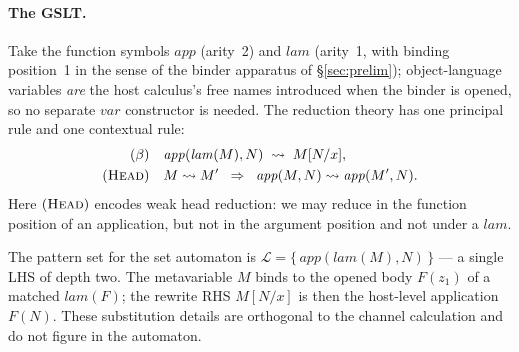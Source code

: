 \documentclass[11pt]{article}
\theoremstyle{plain}
\theoremstyle{definition}
\theoremstyle{remark}
\newcommand{\rew}{\leadsto}
\newcommand{\Lhs}{\mathcal{L}}
\begin{document}
\paragraph{The GSLT.}
Take the function symbols $\mathit{app}$ (arity~2) and $\mathit{lam}$
(arity~1, with binding position~1 in the sense of the binder apparatus
of \S\ref{sec:prelim}); object-language variables \emph{are} the host
calculus's free names introduced when the binder is opened, so no
separate $\mathit{var}$ constructor is needed. The reduction theory
has one principal rule and one contextual rule:
\begin{align*}
  (\beta) \quad
    & \mathit{app}(\mathit{lam}(M), N) \;\rew\; M[N/x], \\
  (\textsc{Head}) \quad
    & M \rew M' \;\;\Rightarrow\;\;
      \mathit{app}(M, N) \rew \mathit{app}(M', N).
\end{align*}
Here $(\textsc{Head})$ encodes weak head reduction: we may reduce in
the function position of an application, but not in the argument
position and not under a $\mathit{lam}$.

The pattern set for the set automaton is
$\Lhs = \{\,\mathit{app}(\mathit{lam}(M), N)\,\}$ --- a single LHS of
depth two. The metavariable $M$ binds to the opened body
$F(z_{1})$ of a matched $\mathit{lam}(F)$; the rewrite RHS
$M[N/x]$ is then the host-level application $F(N)$. These
substitution details are orthogonal to the channel calculation and
do not figure in the automaton.
\end{document}
